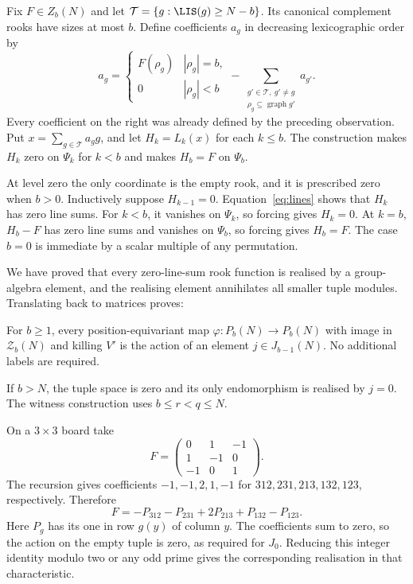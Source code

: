 Fix $F\in Z_b(N)$ and let $\mathcal T=\{g:\LIS(g)\ge N-b\}$. Its canonical complement rooks have sizes at most $b$. Define coefficients $a_g$ in decreasing lexicographic order by
\begin{equation}\label{eq:triangular}
a_g=\begin{cases}F(\rho_g)&|\rho_g|=b,\\0&|\rho_g|<b\end{cases}
-\sum_{\substack{g'\in\mathcal T,\ g'\ne g\\\rho_g\subseteq\operatorname{graph}g'}}a_{g'}.
\end{equation}
Every coefficient on the right was already defined by the preceding observation. Put $x=\sum_{g\in\mathcal T}a_gg$, and let $H_k=L_k(x)$ for each $k\le b$. The construction makes $H_k$ zero on $\Psi_k$ for $k<b$ and makes $H_b=F$ on $\Psi_b$.

At level zero the only coordinate is the empty rook, and it is prescribed zero when $b>0$. Inductively suppose $H_{k-1}=0$. Equation~\eqref{eq:lines} shows that $H_k$ has zero line sums. For $k<b$, it vanishes on $\Psi_k$, so forcing gives $H_k=0$. At $k=b$, $H_b-F$ has zero line sums and vanishes on $\Psi_b$, so forcing gives $H_b=F$. The case $b=0$ is immediate by a scalar multiple of any permutation.

We have proved that every zero-line-sum rook function is realised by a group-algebra element, and the realising element annihilates all smaller tuple modules. Translating back to matrices proves:
\begin{theorem}\label{thm:realization}
For $b\ge1$, every position-equivariant map $\varphi:P_b(N)\to P_b(N)$ with image in $\mathcal Z_b(N)$ and killing $V'$ is the action of an element $j\in J_{b-1}(N)$. No additional labels are required.
\end{theorem}
If $b>N$, the tuple space is zero and its only endomorphism is
realised by $j=0$. The witness construction uses $b\le r<q\le N$.

\begin{example}
On a $3\times3$ board take
\[F=\begin{pmatrix}0&1&-1\\1&-1&0\\-1&0&1\end{pmatrix}.
\]
The recursion gives coefficients $-1,-1,2,1,-1$ for $312,231,213,132,123$, respectively. Therefore
\[F=-P_{312}-P_{231}+2P_{213}+P_{132}-P_{123}.
\]
Here $P_g$ has its one in row $g(y)$ of column $y$. The coefficients sum to zero, so the action on the empty tuple is zero, as required for $J_0$. Reducing this integer identity modulo two or any odd prime gives the corresponding realisation in that characteristic.
\end{example}
